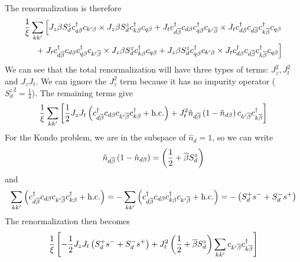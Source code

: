 \documentclass[12pt,twoside]{article}
\numberwithin{equation}{section}
\begin{document}
The renormalization is therefore
\begin{equation}\begin{aligned}
	\frac{1}{\xi}\sum_{kk^\prime} \left[J_z \beta S_d^z c^\dagger_{q\beta}c_{k^\prime\beta}\times J_z \beta S_d^z c^\dagger_{k\beta}c_{q\beta} + J_t  c^\dagger_{d\overline\beta}c_{d\beta} c^\dagger_{q\beta}c_{k^\prime\overline\beta} \times J_t  c^\dagger_{d\beta}c_{d\overline\beta} c^\dagger_{k\overline\beta}c_{q\beta}\right.\\
	+\left. J_t  c^\dagger_{d\overline\beta}c_{d\beta} c^\dagger_{q\beta}c_{k^\prime\overline\beta}\times J_z \beta S_d^z c^\dagger_{k\beta}c_{q\beta} + J_z \beta S_d^z c^\dagger_{q\beta}c_{k^\prime\beta}\times J_t  c^\dagger_{d\beta}c_{d\overline\beta} c^\dagger_{k\overline\beta}c_{q\beta}\right]
\end{aligned}\end{equation}
We can see that the total renormalization will have three types of terms: \(J_z^2, J_t^2\) and \(J_z J_t\). We can ignore the \(J_z^2\) term because it has no impurity operator (\({S_d^z}^2 = \frac{1}{4}\)). The remaining terms give
\begin{equation}\begin{aligned}
	\label{kondo_part}
	\frac{1}{\xi}\sum_{kk^\prime} \left[\frac{1}{2} J_z J_t\left(c^\dagger_{d\overline\beta}c_{d\beta}c_{k^\prime\overline\beta}c^\dagger_{k\beta} + \text{h.c.}\right) + J_t^2 \hat n_{d\overline\beta}\left(1 - \hat n_{d\beta}\right) c_{k^\prime\overline\beta}c^\dagger_{k\overline\beta}\right]
\end{aligned}\end{equation}
For the Kondo problem, we are in the subspace of \(\hat n_d= 1\), so we can write
\begin{equation}\begin{aligned}
	\hat n_{d\overline\beta}\left(1 - \hat n_{d\beta}\right) = \left(\frac{1}{2} +  \overline\beta S_d^z \right)
\end{aligned}\end{equation}
and
\begin{equation}\begin{aligned}
	\sum_{kk^\prime}\left( c^\dagger_{d\overline\beta}c_{d\beta}c_{k^\prime\overline\beta}c^\dagger_{k\beta} + \text{h.c.}\right) = -\sum_{kk^\prime}\left( c^\dagger_{d\overline\beta}c_{d\beta}c^\dagger_{k\beta}c_{k^\prime\overline\beta} + \text{h.c.}\right) = -\left(S_d^+ s^- + S_d^- s^+\right)
\end{aligned}\end{equation}
The renormalization then becomes
\begin{equation}\begin{aligned}
	\frac{1}{\xi} \left[-\frac{1}{2} J_z J_t\left(S_d^+ s^- + S_d^- s^+\right) + J_t^2 \left(\frac{1}{2} +  \overline\beta S_d^z \right) \sum_{kk^\prime}c_{k^\prime\overline\beta}c^\dagger_{k\overline\beta}\right]
\end{aligned}\end{equation}
\end{document}
